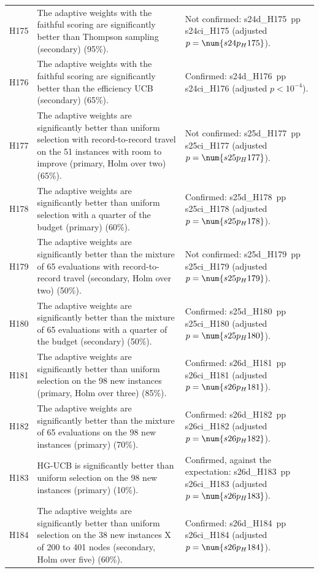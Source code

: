 \begin{center}
\begin{longtable}{>{\raggedright\arraybackslash}p{0.9cm}>{\raggedright\arraybackslash}p{5.2cm}>{\raggedright\arraybackslash}p{8.5cm}}
H175 & The adaptive weights with the faithful scoring are significantly better than Thompson sampling (secondary) (95\%). & Not confirmed: \num{s24d_H175}~pp \num{s24ci_H175} (adjusted $p=\num{s24p_H175}$). \\
H176 & The adaptive weights with the faithful scoring are significantly better than the efficiency UCB (secondary) (65\%). & Confirmed: \num{s24d_H176}~pp \num{s24ci_H176} (adjusted $p<10^{-4}$). \\
H177 & The adaptive weights are significantly better than uniform selection with record-to-record travel on the 51 instances with room to improve (primary, Holm over two) (65\%). & Not confirmed: \num{s25d_H177}~pp \num{s25ci_H177} (adjusted $p=\num{s25p_H177}$). \\
H178 & The adaptive weights are significantly better than uniform selection with a quarter of the budget (primary) (60\%). & Confirmed: \num{s25d_H178}~pp \num{s25ci_H178} (adjusted $p=\num{s25p_H178}$). \\
H179 & The adaptive weights are significantly better than the mixture of 65 evaluations with record-to-record travel (secondary, Holm over two) (50\%). & Not confirmed: \num{s25d_H179}~pp \num{s25ci_H179} (adjusted $p=\num{s25p_H179}$). \\
H180 & The adaptive weights are significantly better than the mixture of 65 evaluations with a quarter of the budget (secondary) (50\%). & Confirmed: \num{s25d_H180}~pp \num{s25ci_H180} (adjusted $p=\num{s25p_H180}$). \\
H181 & The adaptive weights are significantly better than uniform selection on the 98 new instances (primary, Holm over three) (85\%). & Confirmed: \num{s26d_H181}~pp \num{s26ci_H181} (adjusted $p=\num{s26p_H181}$). \\
H182 & The adaptive weights are significantly better than the mixture of 65 evaluations on the 98 new instances (primary) (70\%). & Confirmed: \num{s26d_H182}~pp \num{s26ci_H182} (adjusted $p=\num{s26p_H182}$). \\
H183 & HG-UCB is significantly better than uniform selection on the 98 new instances (primary) (10\%). & Confirmed, against the expectation: \num{s26d_H183}~pp \num{s26ci_H183} (adjusted $p=\num{s26p_H183}$). \\
H184 & The adaptive weights are significantly better than uniform selection on the 38 new instances X of 200 to 401 nodes (secondary, Holm over five) (60\%). & Confirmed: \num{s26d_H184}~pp \num{s26ci_H184} (adjusted $p=\num{s26p_H184}$). \\

\end{longtable}
\end{center}
